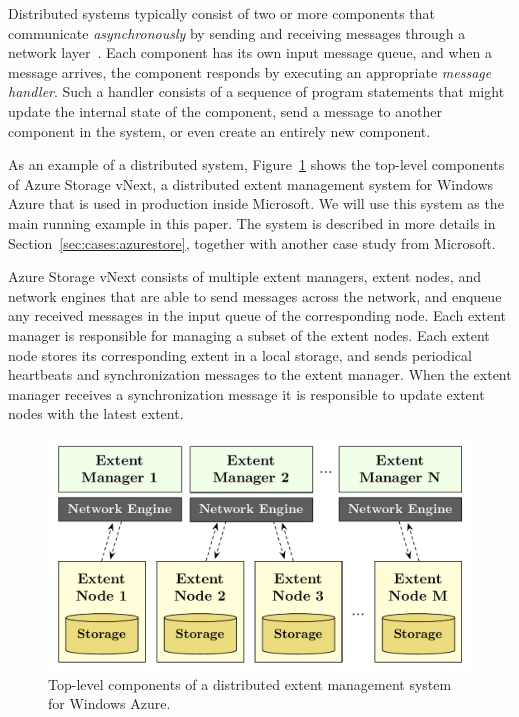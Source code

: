 Distributed systems typically consist of two or more components that communicate \emph{asynchronously} by sending and receiving messages through a network layer~\cite{lamport1978time}. Each component has its own input message queue, and when a message arrives, the component responds by executing an appropriate \emph{message handler}. Such a handler consists of a sequence of program statements that might update the internal state of the component, send a message to another component in the system, or even create an entirely new component.

As an example of a distributed system, Figure~\ref{fig:azurestore} shows the top-level components of Azure Storage vNext, a distributed extent management system for Windows Azure that is used in production inside Microsoft. We will use this system as the main running example in this paper. The system is described in more details in Section~\ref{sec:cases:azurestore}, together with another case study from Microsoft.

Azure Storage vNext consists of multiple extent managers, extent nodes, and network engines that are able to send messages across the network, and enqueue any received messages in the input queue of the corresponding node. Each extent manager is responsible for managing a subset of the extent nodes. Each extent node stores its corresponding extent in a local storage, and sends periodical heartbeats and synchronization messages to the extent manager. When the extent manager receives a synchronization message it is responsible to update extent nodes with the latest extent.

\begin{figure}[t]
\centering
\includegraphics[width=\linewidth]{img/azurestore}
\caption{Top-level components of a distributed extent management system for Windows Azure.}
\label{fig:azurestore}
\end{figure}

